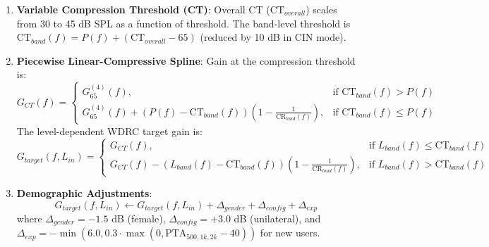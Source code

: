 \documentclass[
  12pt,
]{article}
\begin{document}
\begin{enumerate}
  \emph{(Note on Evidentiary Asymmetry: The 1.5:1 CIN clamp is an
  asserted engineering heuristic inspired by NAL-NL3 to curb listening
  fatigue in noise, lacking direct empirical derivation. In contrast,
  the global upper ceiling on compression ratios (\(\le 3.0:1\)) is
  directly supported by extensive psychoacoustic literature {[}Souza,
  2002; Souza et al., 2006{]}, which demonstrates that compression
  ratios exceeding 3.0:1 cause severe temporal envelope flattening and
  acoustic contrast degradation).}
\item
  \textbf{Variable Compression Threshold (CT)}: Overall CT
  (\(\text{CT}_{overall}\)) scales from 30 to 45 dB SPL as a function of
  threshold. The band-level threshold is
  \(\text{CT}_{band}(f) = P(f) + (\text{CT}_{overall} - 65)\) (reduced
  by 10 dB in CIN mode).
\item
  \textbf{Piecewise Linear-Compressive Spline}: Gain at the compression
  threshold is: \begin{equation}
  G_{CT}(f) = \begin{cases} 
  G_{65}^{(4)}(f), & \text{if } \text{CT}_{band}(f) > P(f) \\ 
  G_{65}^{(4)}(f) + \left(P(f) - \text{CT}_{band}(f)\right)\left(1 - \frac{1}{\text{CR}_{loud}(f)}\right), & \text{if } \text{CT}_{band}(f) \le P(f) 
  \end{cases}
  \end{equation} The level-dependent WDRC target gain is:
  \begin{equation}
  G_{target}(f, L_{in}) = \begin{cases} 
  G_{CT}(f), & \text{if } L_{band}(f) \le \text{CT}_{band}(f) \\ 
  G_{CT}(f) - \left(L_{band}(f) - \text{CT}_{band}(f)\right)\left(1 - \frac{1}{\text{CR}_{loud}(f)}\right), & \text{if } L_{band}(f) > \text{CT}_{band}(f) 
  \end{cases}
  \end{equation}
\item
  \textbf{Demographic Adjustments}: \begin{equation}
  G_{target}(f, L_{in}) \leftarrow G_{target}(f, L_{in}) + \Delta_{gender} + \Delta_{config} + \Delta_{exp}
  \end{equation} where \(\Delta_{gender} = -1.5\) dB (female),
  \(\Delta_{config} = +3.0\) dB (unilateral), and
  \(\Delta_{exp} = -\min\left(6.0, 0.3 \cdot \max\left(0, \text{PTA}_{500,1k,2k} - 40\right)\right)\)
  for new users.
\end{enumerate}
\end{document}

